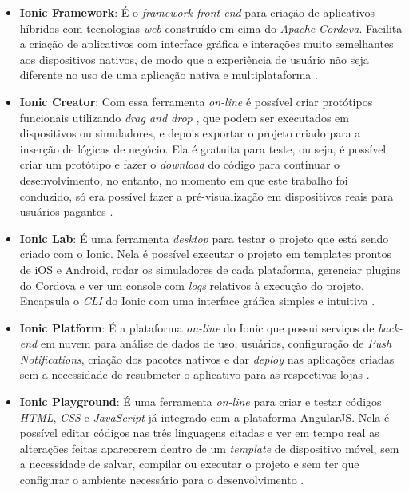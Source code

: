 \begin{itemize}

    \item \textbf{Ionic Framework}: É o \textit{framework front-end} para criação de aplicativos híbridos com tecnologias \textit{web} construído em cima
    do \textit{Apache Cordova}. Facilita a criação de aplicativos com interface gráfica e interações muito semelhantes aos dispositivos nativos, de modo que 
    a experiência de usuário não seja diferente no uso de uma aplicação nativa e multiplataforma \cite{drifty_ionic:_2016}. 
    
    \item \textbf{Ionic Creator}: Com essa ferramenta \textit{on-line} é possível criar protótipos funcionais utilizando \textit{drag and drop}
    , que podem ser executados em dispositivos ou simuladores, e depois exportar o projeto criado para a 
    inserção de lógicas de negócio. Ela é gratuita para teste, ou seja, é possível criar um protótipo e fazer o \textit{download}
    do código para continuar o desenvolvimento, no entanto, no momento em que este trabalho foi conduzido, só era possível
    fazer a pré-visualização em dispositivos reais para usuários pagantes \cite{drifty_ionic_2016-1}.
    
    \item \textbf{Ionic Lab}: É uma ferramenta \textit{desktop} para testar o projeto que está sendo criado com o Ionic. Nela é possível
    executar o projeto em templates prontos de iOS e Android, rodar os simuladores de cada plataforma,
    gerenciar plugins do Cordova e ver um console com \textit{logs} relativos à execução do projeto. Encapsula o \textit{CLI} do Ionic com uma interface gráfica simples
    e intuitiva \cite{drifty_ionic_2016-2}.
    
    \item \textbf{Ionic Platform}: É a plataforma \textit{on-line} do Ionic que possui serviços de \textit{back-end} em nuvem para análise de dados de uso,
     usuários, configuração de \textit{Push Notifications}, criação dos pacotes nativos e dar \textit{deploy} nas aplicações criadas sem a necessidade de
     resubmeter o aplicativo para as respectivas lojas \cite{drifty_ionic_2016-3}.
     
    \item \textbf{Ionic Playground}: É uma ferramenta \textit{on-line} para criar e testar códigos \textit{HTML}, \textit{CSS} e \textit{JavaScript} 
    já integrado com a plataforma AngularJS. Nela é possível editar códigos nas três linguagens citadas e ver em tempo real as alterações 
    feitas aparecerem dentro de um \textit{template} de dispositivo móvel, sem a necessidade de salvar, compilar ou executar o projeto e sem ter que 
    configurar o ambiente necessário para o desenvolvimento \cite{drifty_ionic_2016-4}. 
    

\end{itemize}
